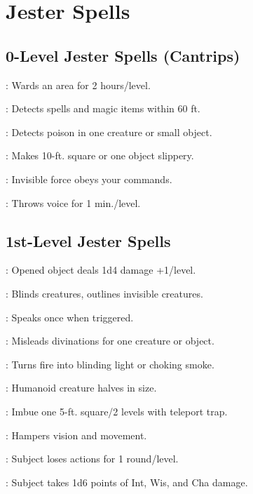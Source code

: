 \section{Jester Spells}

\begin{multicols}{2}

\subsection{0-Level Jester Spells (Cantrips)}
\begin{description*}
\item[\linkspell{Alarm}:] Wards an area for 2 hours/level.
\item[\linkspell{Detect Magic}:] Detects spells and magic items within 60 ft.
\item[\linkspell{Detect Poison}:] Detects poison in one creature or small object.
\item[\linkspell{Grease}:] Makes 10-ft. square or one object slippery.
\item[\linkspell{Unseen Servant}:] Invisible force obeys your commands.
\item[\linkspell{Ventriloquism}:] Throws voice for 1 min./level.
\end{description*}

\subsection{1st-Level Jester Spells}
\begin{description*}
\item[\linkspell{Fire Trap}:] Opened object deals 1d4 damage +1/level.
\item[\linkspell{Glitterdust}:] Blinds creatures, outlines invisible creatures.
\item[\linkspell{Magic Mouth}:] Speaks once when triggered.
\item[\linkspell{Misdirection}:] Misleads divinations for one creature or object.
\item[\linkspell{Pyrotechnics}:] Turns fire into blinding light or choking smoke.
\item[\linkspell{Reduce Person}:] Humanoid creature halves in size.
\item[\linkspell{Scattering Trap}:] Imbue one 5-ft. square/2 levels with teleport trap.
\item[\linkspell{Sleet Storm}:] Hampers vision and movement.
\item[\linkspell{Tasha’s Hideous Laughter}:] Subject loses actions for 1 round/level.
\item[\linkspell{Touch of Idiocy}:] Subject takes 1d6 points of Int, Wis, and Cha damage.
\end{description*}


\end{multicols}
